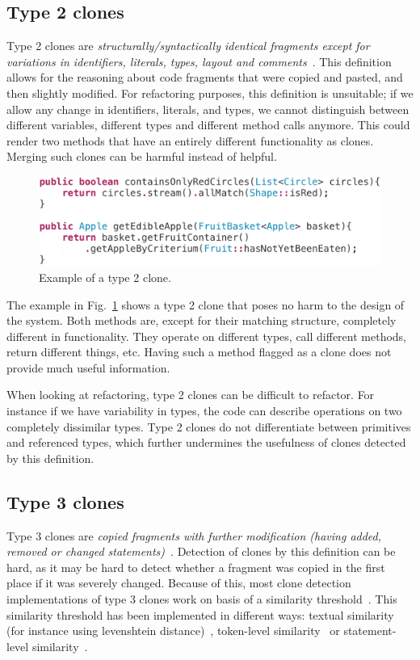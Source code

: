 \documentclass[a4paper]{article}
\begin{document}
\subsection{Type 2 clones}\label{sec:type2}
Type 2 clones are \textit{structurally/syntactically identical fragments except for variations in identifiers, literals, types, layout and comments}~\cite{roy2007survey}. This definition allows for the reasoning about code fragments that were copied and pasted, and then slightly modified. For refactoring purposes, this definition is unsuitable; if we allow any change in identifiers, literals, and types, we cannot distinguish between different variables, different types and different method calls anymore. This could render two methods that have an entirely different functionality as clones. Merging such clones can be harmful instead of helpful.

\begin{figure}[H]
  \includegraphics[width=1\columnwidth]{img/type2}
  \caption{Example of a type 2 clone.}
  \label{fig:type2}
\end{figure}

The example in Fig.~\ref{fig:type2} shows a type 2 clone that poses no harm to the design of the system. Both methods are, except for their matching structure, completely different in functionality. They operate on different types, call different methods, return different things, etc. Having such a method flagged as a clone does not provide much useful information.

When looking at refactoring, type 2 clones can be difficult to refactor. For instance if we have variability in types, the code can describe operations on two completely dissimilar types. Type 2 clones do not differentiate between primitives and referenced types, which further undermines the usefulness of clones detected by this definition.

\subsection{Type 3 clones}\label{sec:type3}
Type 3 clones are \textit{copied fragments with further modification (having added, removed or changed statements)}~\cite{roy2007survey}. Detection of clones by this definition can be hard, as it may be hard to detect whether a fragment was copied in the first place if it was severely changed. Because of this, most clone detection implementations of type 3 clones work on basis of a similarity threshold~\cite{roy2008nicad,ragkhitwetsagul2019siamese,jiang2007deckard,semura2017ccfindersw}. This similarity threshold has been implemented in different ways: textual similarity (for instance using levenshtein distance)~\cite{lavoie2011automated}, token-level similarity~\cite{sajnani2016sourcerercc} or statement-level similarity~\cite{kamalpriya2017enhancing}.
\end{document}

